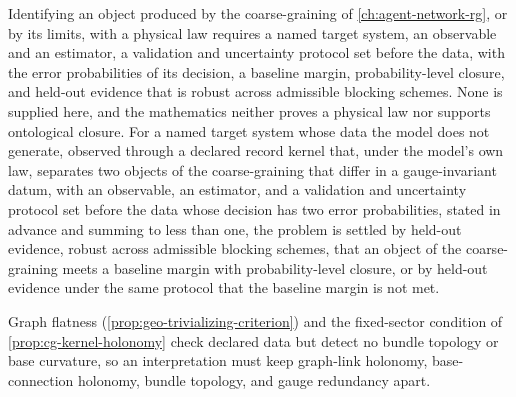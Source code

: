 Identifying an object produced by the coarse-graining of
\cref{ch:agent-network-rg}, or by its limits, with a physical law requires a
named target system, an observable and an estimator, a validation and
uncertainty protocol set before the data, with the error probabilities of its
decision, a baseline margin, probability-level closure, and held-out evidence that is robust across admissible blocking
schemes. None is supplied here, and the mathematics neither proves a physical
law nor supports ontological closure. For a named target system whose data the
model does not generate, observed through a declared record kernel that, under
the model's own law, separates two objects of the coarse-graining that differ
in a gauge-invariant datum, with an observable, an estimator, and a validation
and uncertainty protocol set before the data whose decision has two error
probabilities, stated in advance and summing to less than one, the problem is
settled by
held-out evidence, robust across admissible blocking schemes, that an object of
the coarse-graining meets a baseline margin with probability-level closure, or
by held-out evidence under the same protocol that the baseline margin is not
met.

Graph flatness (\cref{prop:geo-trivializing-criterion}) and the fixed-sector
condition of \cref{prop:cg-kernel-holonomy} check declared data but detect no
bundle topology or base curvature, so an interpretation must keep graph-link
holonomy, base-connection holonomy, bundle topology, and gauge redundancy apart.

